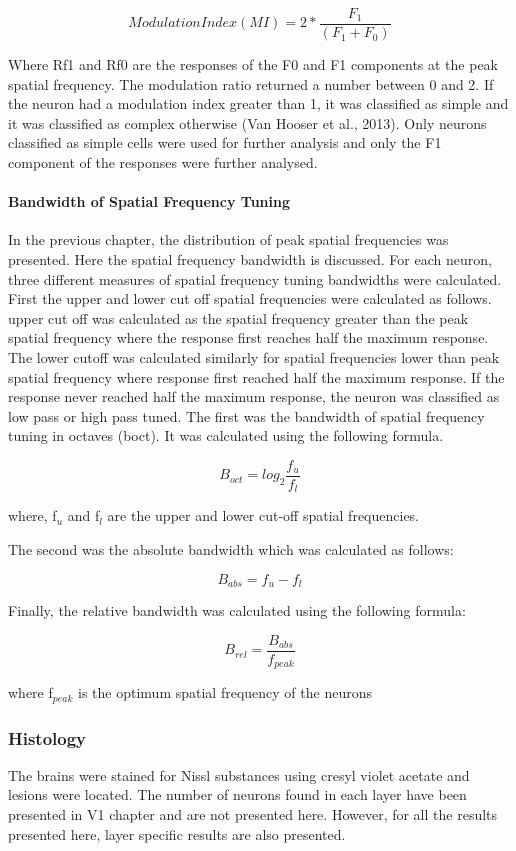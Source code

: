				\[Modulation Index (MI)= 2*\frac{F_1}{(F_1+F_0)}\]
				
				Where Rf1 and Rf0 are the responses of the F0 and F1 components at the peak spatial frequency.
				The modulation ratio returned a number between 0 and 2. If the neuron had a modulation index greater than 1, it was classified as simple and it was classified as complex otherwise (Van Hooser et al., 2013). Only neurons classified as simple cells were used for further analysis and only the F1 component of the responses were further analysed.
				
				\paragraph{Bandwidth of Spatial Frequency Tuning}
				In the previous chapter, the distribution of peak spatial frequencies was presented. Here the spatial frequency bandwidth is discussed. For each neuron, three different measures of spatial frequency tuning bandwidths were calculated. First the upper and lower cut off spatial frequencies were calculated as follows. upper cut off was calculated as the spatial frequency greater than the peak spatial frequency where the response first reaches half the maximum response. The lower cutoff was calculated similarly for spatial frequencies lower than peak spatial frequency where response first reached half the maximum response. If the response never reached half the maximum response, the neuron was classified as low pass or high pass tuned. The first was the bandwidth of spatial frequency tuning in octaves (boct). It was calculated using the following formula.
				
				\[B_{oct}=log_2\frac{f_u}{f_l}\]
				
				where, f$_u$ and f$_l$ are the upper and lower cut-off spatial frequencies.
				
				The second was the absolute bandwidth which was calculated as follows:
				
				\[B_{abs}=f_u-f_l\]
				
				Finally, the relative bandwidth was calculated using the following formula:
				
				\[B_{rel}=\frac{B_{abs}}{f_{peak}}\]
				
				where f$_{peak}$ is the optimum spatial frequency of the neurons
								
		\subsubsection{Histology}
				The brains were stained for Nissl substances using cresyl violet acetate and lesions were located. The number of neurons found in each layer have been presented in V1 chapter and are not presented here. However, for all the results presented here, layer specific results are also presented.
							
